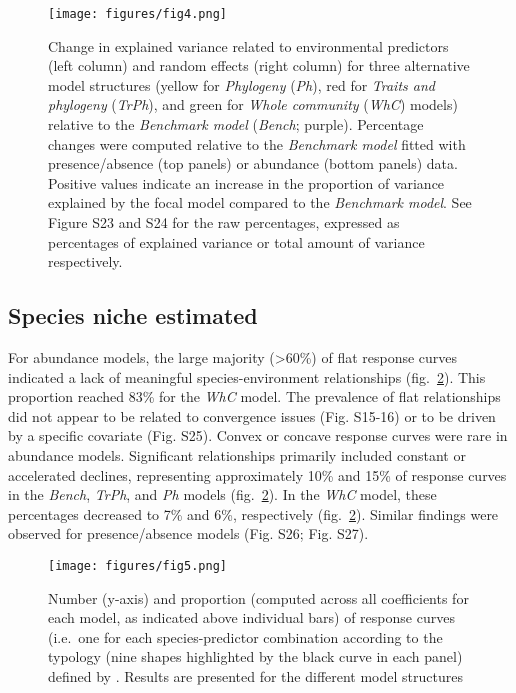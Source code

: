 \documentclass[9pt,biorxiv,doublespacing,lineno]{lapreprint}
\begin{document}
\begin{figure}
\hypertarget{fig:chapt1fig4}{%
\centering
\texttt{[image: figures/fig4.png]}
\caption{Change in explained variance related to environmental
predictors (left column) and random effects (right column) for three
alternative model structures (yellow for \emph{Phylogeny} (\emph{Ph}),
red for \emph{Traits and phylogeny} (\emph{TrPh}), and green for
\emph{Whole community} (\emph{WhC}) models) relative to the
\emph{Benchmark model} (\emph{Bench}; purple). Percentage changes were
computed relative to the \emph{Benchmark model} fitted with
presence/absence (top panels) or abundance (bottom panels) data.
Positive values indicate an increase in the proportion of variance
explained by the focal model compared to the \emph{Benchmark model}. See
Figure S23 and S24 for the raw percentages, expressed as percentages of
explained variance or total amount of variance
respectively.}\label{fig:chapt1fig4}
}
\end{figure}

\hypertarget{species-niche-estimated}{%
\subsection{Species niche estimated}\label{species-niche-estimated}}

For abundance models, the large majority (\textgreater60\%) of flat
response curves indicated a lack of meaningful species-environment
relationships (fig.~\ref{fig:chapt1fig5}). This proportion reached 83\%
for the \emph{WhC} model. The prevalence of flat relationships did not
appear to be related to convergence issues (Fig. S15-16) or to be driven
by a specific covariate (Fig. S25). Convex or concave response curves
were rare in abundance models. Significant relationships primarily
included constant or accelerated declines, representing approximately
10\% and 15\% of response curves in the \emph{Bench}, \emph{TrPh}, and
\emph{Ph} models (fig.~\ref{fig:chapt1fig5}). In the \emph{WhC} model,
these percentages decreased to 7\% and 6\%, respectively
(fig.~\ref{fig:chapt1fig5}). Similar findings were observed for
presence/absence models (Fig. S26; Fig. S27).

\begin{figure}
\hypertarget{fig:chapt1fig5}{%
\centering
\texttt{[image: figures/fig5.png]}
\caption{Number (y-axis) and proportion (computed across all
coefficients for each model, as indicated above individual bars) of
response curves (i.e.~one for each species-predictor combination
according to the typology (nine shapes highlighted by the black curve in
each panel) defined by \textcite{Rigal_2020}. Results are presented for
the different model structures}\label{fig:chapt1fig5}
}
\end{figure}
\end{document}

